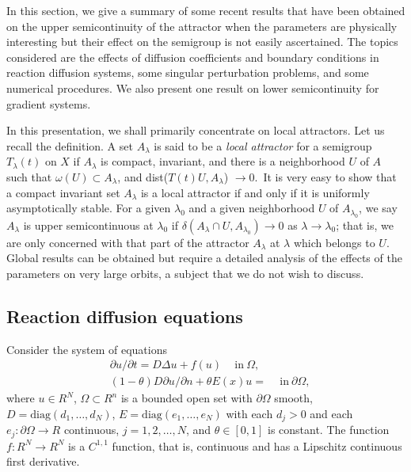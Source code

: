 \documentclass{surv-l}
\theoremstyle{plain}
\theoremstyle{definition}
\numberwithin{equation}{section}
\numberwithin{figure}{chapter}
\begin{document}
In this section, we give a summary of some recent results that have been obtained on the upper semicontinuity of the attractor when the parameters are physically interesting but their effect on the semigroup is not easily ascertained. The topics considered are the effects of diffusion coefficients and boundary conditions in reaction diffusion systems, some singular perturbation problems, and some numerical procedures. We also present one result on lower semicontinuity for gradient systems.

In this presentation, we shall primarily concentrate on local attractors. Let us recall the definition. A set $A_{\lambda}$ is said to be a \emph{local attractor} for a semigroup $T_{\lambda}(t)$ on $X$ if $A_{\lambda}$ is compact, invariant, and there is a neighborhood $U$ of $A$ such that $\omega(U)\subset A_{\lambda}$, and dist($T(t)U, A_{\lambda}$) $\rightarrow 0$.\, It is very easy to show that a compact invariant set $A_{\lambda}$ is a local attractor if and only if it is uniformly asymptotically stable. For a given $\lambda_{0}$ and a given neighborhood $U$ of $A_{\lambda_{0}}$, we say $A_{\lambda}$ is upper semicontinuous at $\lambda_{0}$ if $\delta(A_{\lambda}\cap U, A_{\lambda_{0}})\rightarrow 0$ as $\lambda\rightarrow\lambda_{0}$; that is, we are only concerned with that part of the attractor $A_{\lambda}$ at $\lambda$ which belongs to $U$. Global results can be obtained but require a detailed analysis of the effects of the parameters on very large orbits, a subject that we do not wish to discuss.

\subsection{Reaction diffusion equations}\label{subsec4.10.1}  Consider the system of equations
\begin{align}\label{chap04:eq10.1}
&\partial u/\partial t=D\Delta u+f(u)\quad\, \mathrm{in}\ \Omega,\\
&(1-\theta)D\partial u/\partial n+\theta E(x)u=\quad\, \mathrm{in}\ \partial\Omega,\label{chap04:eq10.2}
\end{align}
where $u\in R^{N}$, $\Omega \subset R^{n}$ is a bounded open set with $\partial\Omega$ smooth, $D=\mathrm{diag}(d_{1}, \ldots, d_{N})$, $E=\mathrm{diag}(e_{1}, \ldots, e_{N})$ with each $d_{j}>0$ and each $e_{j}:\partial\Omega\rightarrow R$ continuous, $j=1,2, \ldots, N$, and $\theta\in[0,1]$ is constant. The function $f:R^{N}\rightarrow R^{N}$ is a $C^{1,1}$ function, that is, continuous and has a Lipschitz continuous first derivative.
\end{document}
